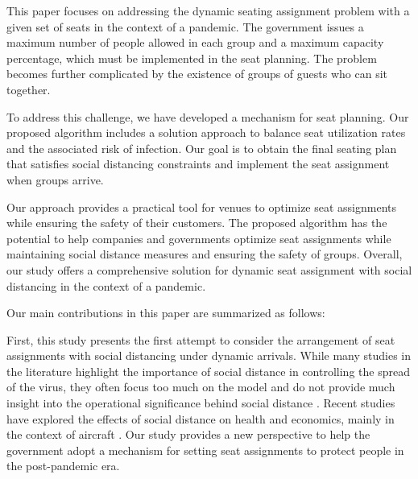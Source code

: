 


This paper focuses on addressing the dynamic seating assignment problem with a given set of seats in the context of a pandemic. The government issues a maximum number of people allowed in each group and a maximum capacity percentage, which must be implemented in the seat planning. The problem becomes further complicated by the existence of groups of guests who can sit together.

To address this challenge, we have developed a mechanism for seat planning. Our proposed algorithm includes a solution approach to balance seat utilization rates and the associated risk of infection. Our goal is to obtain the final seating plan that satisfies social distancing constraints and implement the seat assignment when groups arrive.

Our approach provides a practical tool for venues to optimize seat assignments while ensuring the safety of their customers. The proposed algorithm has the potential to help companies and governments optimize seat assignments while maintaining social distance measures and ensuring the safety of groups. Overall, our study offers a comprehensive solution for dynamic seat assignment with social distancing in the context of a pandemic.


Our main contributions in this paper are summarized as follows:

First, this study presents the first attempt to consider the arrangement of seat assignments with social distancing under dynamic arrivals. While many studies in the literature highlight the importance of social distance in controlling the spread of the virus, they often focus too much on the model and do not provide much insight into the operational significance behind social distance \cite{barry2021optimal, fischetti2021safe}. Recent studies have explored the effects of social distance on health and economics, mainly in the context of aircraft \cite{salari2020social, ghorbani2020model, salari2022social}. Our study provides a new perspective to help the government adopt a mechanism for setting seat assignments to protect people in the post-pandemic era.

